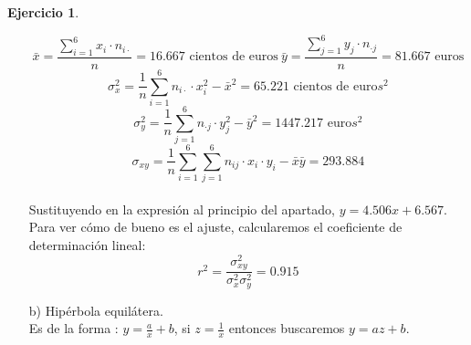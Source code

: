 \documentclass[a4paper, 12pt]{article}
\theoremstyle{definition}
\newtheorem{ej}{Ejercicio}
\begin{document}
\begin{ej}
\begin{enumerate}
    $$\bar{x} = \frac{\displaystyle\sum_{i=1}^6 x_i \cdot n_{i \cdot}}{n} = 16.667 \text{ cientos de euros} \ \bar{y} = \frac{\displaystyle\sum_{j=1}^6 y_j \cdot n_{\cdot j}}{n} = 81.667 \text{ euros}$$
    $$\sigma_x^2 = \frac{1}{n} \displaystyle \sum_{i = 1}^6 n_{i \cdot} \cdot x_i^2 - \bar{x}^2 = 65.221 \text{ cientos de euro} s^2$$
    $$\sigma_y^2 = \frac{1}{n} \displaystyle \sum_{j = 1}^6 n_{\cdot j} \cdot y_j^2 - \bar{y}^2 = 1447.217 \text{ euro} s^2$$
    $$\sigma_{xy} = \frac{1}{n}   \displaystyle \sum_{i = 1}^6 \sum_{j=1}^6 n_{ij} \cdot x_i \cdot y_i - \bar{x} \bar{y} = 293.884$$
    \\
    Sustituyendo en la expresión al principio del apartado, $y = 4.506x + 6.567$.
    \\
    Para ver cómo de bueno es el ajuste, calcularemos el coeficiente de determinación lineal:
    $$ r^2 = \dfrac{\sigma_{xy}^2}{\sigma_x^2 \sigma_y^2} = 0.915$$
    \item[b) ] Hipérbola equilátera.
    \\
    Es de la forma : $y = \frac{a}{x} + b$, si $z = \frac{1}{x}$ entonces buscaremos $y = az + b$. \\
    

\end{enumerate}
\end{ej}
\end{document}
